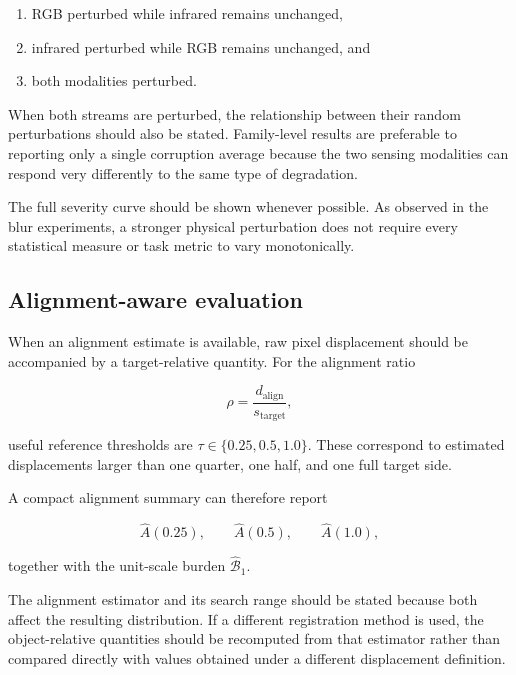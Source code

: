 \documentclass[10pt]{article}
\begin{document}
\begin{enumerate}
    \item RGB perturbed while infrared remains unchanged,
    \item infrared perturbed while RGB remains unchanged, and
    \item both modalities perturbed.
\end{enumerate}

When both streams are perturbed, the relationship between their random perturbations should also be stated. Family-level results are preferable to reporting only a single corruption average because the two sensing modalities can respond very differently to the same type of degradation.

The full severity curve should be shown whenever possible. As observed in the blur experiments, a stronger physical perturbation does not require every statistical measure or task metric to vary monotonically.

\subsection{Alignment-aware evaluation}

When an alignment estimate is available, raw pixel displacement should be accompanied by a target-relative quantity. For the alignment ratio

\begin{equation}
\rho=\frac{d_{\mathrm{align}}}{s_{\mathrm{target}}},
\end{equation}

useful reference thresholds are $\tau\in\{0.25,0.5,1.0\}$. These correspond to estimated displacements larger than one quarter, one half, and one full target side.

A compact alignment summary can therefore report

\begin{equation}
\widehat A(0.25), \qquad
\widehat A(0.5), \qquad
\widehat A(1.0),
\end{equation}

together with the unit-scale burden $\widehat{\mathcal B}_1$.

The alignment estimator and its search range should be stated because both affect the resulting distribution. If a different registration method is used, the object-relative quantities should be recomputed from that estimator rather than compared directly with values obtained under a different displacement definition.
\end{document}

